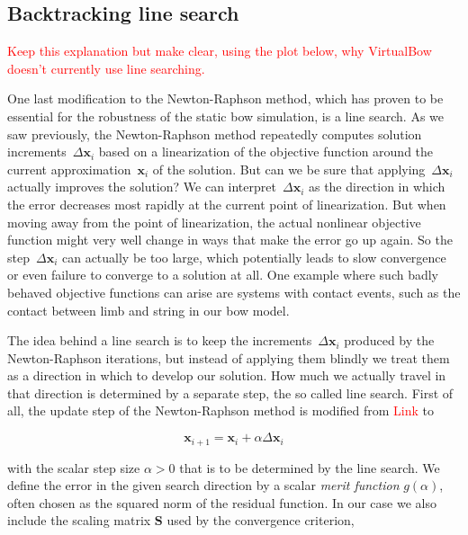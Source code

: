 \subsection{Backtracking line search}

\textcolor{red}{Keep this explanation but make clear, using the plot below, why VirtualBow doesn't currently use line searching.}

One last modification to the Newton-Raphson method, which has proven to be essential for the robustness of the static bow simulation, is a line search.
As we saw previously, the Newton-Raphson method repeatedly computes solution increments~$\Delta\boldsymbol{x}_{i}$ based on a linearization of the objective function around the current approximation~$\boldsymbol{x}_{i}$ of the solution.
But can we be sure that applying~$\Delta\boldsymbol{x}_{i}$ actually improves the solution?
We can interpret~$\Delta\boldsymbol{x}_{i}$ as the direction in which the error decreases most rapidly at the current point of linearization.
But when moving away from the point of linearization, the actual nonlinear objective function might very well change in ways that make the error go up again.
So the step~$\Delta\boldsymbol{x}_{i}$ can actually be too large, which potentially leads to slow convergence or even failure to converge to a solution at all.
One example where such badly behaved objective functions can arise are systems with contact events, such as the contact between limb and string in our bow model.

The idea behind a line search is to keep the increments~$\Delta\boldsymbol{x}_{i}$ produced by the Newton-Raphson iterations, but instead of applying them blindly we treat them as a direction in which to develop our solution.
How much we actually travel in that direction is determined by a separate step, the so called line search.
First of all, the update step of the Newton-Raphson method is modified from \textcolor{red}{Link} to

\begin{equation}
\boldsymbol{x}_{i+1} = \boldsymbol{x}_{i} + \alpha\Delta\boldsymbol{x}_{i}
\end{equation}

with the scalar step size $\alpha > 0$ that is to be determined by the line search.
We define the error in the given search direction by a scalar \textit{merit function} $g(\alpha)$, often chosen as the squared norm of the residual function.
In our case we also include the scaling matrix $\boldsymbol{S}$ used by the convergence criterion,

